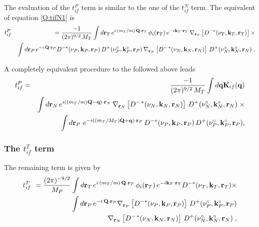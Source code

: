 The evaluation of the $t^{P}_{if}$ term is similar to the one of the
$t^{N}_{if}$ term. The equivalent of equation \ref{Q:tifN1} is
\begin{eqnarray*}
&t^{P}_{if}&\!\!= \frac{-1}{(2 \pi)^{9/2}\, M_{T}}  \int d
\mathbf{r}_{T} \,
  e^{i \, (m_{T}/m) \, \mathbf{Q} \cdot \mathbf{r}_T}
\, \phi_{i}(\mathbf{r}_T) \, e^{-i \mathbf{k}_{T} \cdot \mathbf{r}_T}
\,\nabla_{\mathbf{r}_{T}}\left[ D^{-*}(\nu_{T},\mathbf{k}_{T},\mathbf{r}_T) \right]
{\times}
\\
&& \int d \mathbf{r}_{P} \,
   e^{- i \, \mathbf{Q} \cdot \mathbf{r}_{P}}
 D^{-*}(\nu_{P},\mathbf{k}_{P},\mathbf{r}_{P})
\, D^{+}(\nu_{P}^{\circ},\mathbf{k}_{P}^{\circ},\mathbf{r}_{P}) \,\nabla_{\mathbf{r}_{N}}\left[
D^{-\,\ast}(\nu_{N}, \mathbf{k}_{N}, \mathbf{r}_{N} )  \right]\,
D^{+}(\nu_{N}^{\circ},\mathbf{k}_{N}^{\circ},\mathbf{r}_{N})\; .\nonumber
\end{eqnarray*}

A completely equivalent procedure to the followed above leads
\begin{eqnarray}\label{Q:tifcdw2}
t^{P}_{if}&=& \frac{-1}{(2 \pi)^{9/2}\, M_{T}} \int d \mathbf{q}
\mathbf{K}_{if}(\mathbf{q}) \\
&& \int d \mathbf{r}_{N} \, e^{i \left( (m_{T}/m)\mathbf{Q} - \mathbf{q}
\right) \cdot \mathbf{r}_{N}} \, \nabla_{\mathbf{r}_{N}}\left[
D^{-\,\ast}(\nu_{N}, \mathbf{k}_{N}, \mathbf{r}_{N} ) \right]\,
D^{+}(\nu_{N}^{\circ},\mathbf{k}_{N}^{\circ},\mathbf{r}_{N})\; {\times}
  \\
&& \int d \mathbf{r}_{P} \, \,e^{ -i \left((m_{T}/M_{T})\mathbf{Q}+
\mathbf{q} \right) \cdot \mathbf{r}_{P}} \,
D^{-*}(\nu_{P},\mathbf{k}_{P},\mathbf{r}_{P} ) \, D^{+}(\nu_{P}^{\circ},\mathbf{k}_{P}^{\circ},
\mathbf{r}_{P}) ,\nonumber
\end{eqnarray}

\subsubsection{The $t^{T}_{if}$ term}
The remaining term is given by
%
\begin{eqnarray} \label{Q:tifT1}
&t^{T}_{if}&\!\!= \frac{(2 \pi)^{-9/2}}{M_{P}}  \int d \mathbf{r}_{T} \,
e^{i \, (m_{T}/m) \, \mathbf{Q} \cdot \mathbf{r}_T} \, \phi_{i}(\mathbf{r}_T)
\, e^{-i \mathbf{k}_{T} \cdot \mathbf{r}_T}
D^{-*}(\nu_{T},\mathbf{k}_{T},\mathbf{r}_T) {\times}
\\
&& \int d \mathbf{r}_{P} \, e^{- i \, \mathbf{Q} \cdot \mathbf{r}_{P}}
\nabla_{\mathbf{r}_{P}}\left[ D^{-*}(\nu_{P},\mathbf{k}_{P},\mathbf{r}_{P}) \right]
\,
D^{+}(\nu_{P}^{\circ},\mathbf{k}_{P}^{\circ},\mathbf{r}_{P}) \nonumber \\
&&\,\,\nabla_{\mathbf{r}_{N}}\left[ D^{-\,\ast}(\nu_{N}, \mathbf{k}_{N},
\mathbf{r}_{N} ) \right] \, D^{+}(\nu_{N}^{\circ},\mathbf{k}_{N}^{\circ},\mathbf{r}_{N})\;
,\nonumber
\end{eqnarray}

